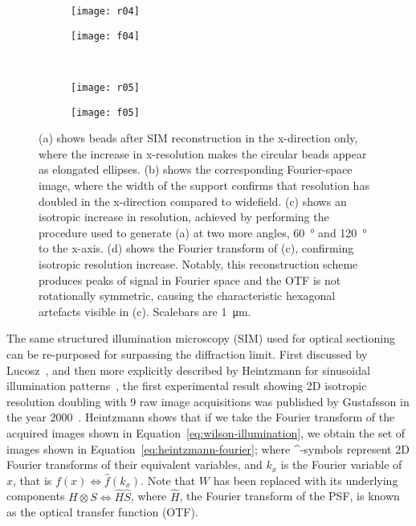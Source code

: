 \begin{figure}[p]
\centering
\begin{subfigure}[b]{0.45\textwidth}
	\texttt{[image: r04]}
	\caption{}\label{fig:beads-x-doubling}
\end{subfigure}
\raisebox{9.3em}{\noindent\Huge$\Leftrightarrow$}
\begin{subfigure}[b]{0.45\textwidth}
	\texttt{[image: f04]}
	\caption{}\label{fig:fourier-x-doubling}
\end{subfigure}
~\newline
\begin{subfigure}[b]{0.45\textwidth}
	\texttt{[image: r05]}
	\caption{}\label{fig:beads-isotropic-doubling}
\end{subfigure}
\raisebox{9.3em}{\noindent\Huge$\Leftrightarrow$}
\begin{subfigure}[b]{0.45\textwidth}
	\texttt{[image: f05]}
	\caption{}\label{fig:fourier-isotropic-doubling}
\end{subfigure}
\caption[LAG SIM: Reconstruction of SIM images takes place in Fourier space]{(a) shows beads after SIM reconstruction in the x-direction only, where the increase in x-resolution makes the circular beads appear as elongated ellipses.  (b) shows the corresponding Fourier-space image, where the width of the support confirms that resolution has doubled in the x-direction compared to widefield. (c) shows an isotropic increase in resolution, achieved by performing the procedure used to generate (a) at two more angles, \SI{60}{\degree} and \SI{120}{\degree} to the x-axis. (d) shows the Fourier transform of (c), confirming isotropic resolution increase. Notably, this reconstruction scheme produces peaks of signal in Fourier space and the OTF is not rotationally symmetric, causing the characteristic hexagonal artefacts visible in (c). Scalebars are \SI{1}{\micro\metre}.}
\label{fig:fourier-reconstruction}
\end{figure}

The same structured illumination microscopy (SIM) used for optical sectioning can be re-purposed for surpassing the diffraction limit. 
First discussed by Lucosz~\cite{lukosz1966optical}, and then more explicitly described by Heintzmann for sinusoidal illumination patterns~\cite{heintzmann1999laterally}, the first experimental result showing 2D isotropic resolution doubling with 9 raw image acquisitions was published by Gustafsson in the year \num{2000}~\cite{gustafsson2000surpassing}. 
Heintzmann shows that if we take the Fourier transform of the acquired images shown in Equation~\ref{eq:wilson-illumination}, we obtain the set of images shown in Equation~\ref{eq:heintzmann-fourier}; where \^{}-symbols represent 2D Fourier transforms of their equivalent variables, and $k_x$ is the Fourier variable of $x$, that is $f(x) \Leftrightarrow \hat{f}(k_x)$. 
Note that $W$ has been replaced with its underlying components $H\otimes S \Leftrightarrow \hat{H}\hat{S}$, where $\hat{H}$, the Fourier transform of the PSF, is known as the optical transfer function (OTF). 

